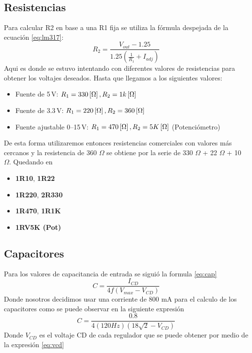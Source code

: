 \documentclass[pdflatex,sn-mathphys-num]{sn-jnl}%
\begin{document}
\subsection*{Resistencias}
Para calcular R2 en base a una R1 fija se utiliza la fórmula despejada de la ecuación \ref{eq:lm317}:
\begin{equation}
    R_2 = \dfrac{V_{out}-1.25}{1.25(\frac{1}{R_1}+I_{adj})}
\end{equation}
Aqui es donde se estuvo intentando con diferentes valores de resistencias para obtener los voltajes deseados. 
Hasta que llegamos a los siguientes valores:
\begin{itemize}
    \item Fuente de 5\,V: $R_1 = 330\left[\Omega\right], R_2 = 1k\left[\Omega\right]$
    \item Fuente de 3.3\,V: $R_1 = 220\left[\Omega\right], R_2 = 360\left[\Omega\right]$
    \item Fuente ajustable 0--15\,V: $R_1 = 470\left[\Omega\right], R_2 = 5K\left[\Omega\right]$ (Potenciómetro)
\end{itemize}
De esta forma utilizaremos entonces resistencias comerciales con valores más cercanos y la resistencia de 360 $\Omega$ se obtiene por la serie de 330 $\Omega$ + 22 $\Omega$ + 10 $\Omega$. Quedando en 
\begin{itemize}
    \item \textbf{1R10}, \textbf{1R22} 
    \item \textbf{1R220}, \textbf{2R330} 
    \item \textbf{1R470}, \textbf{1R1K} 
    \item \textbf{1RV5K (Pot)}
\end{itemize}


\subsection*{Capacitores}
Para los valores de capacitancia de entrada se siguió la formula \ref{eq:cap}
\begin{equation}
    C=\dfrac{I_{CD}}{4f(V_{max}-V_{CD})}
    \label{eq:cap}
\end{equation}
Donde nosotros decidimos usar una corriente de 800 mA para el calculo de los capacitores como se puede observar en la siguiente expresión
$$
C=\dfrac{0.8}{4(120 Hz)(18 \sqrt{2} - V_{CD})}
$$
Donde $V_{CD}$ es el voltaje CD de cada regulador que se puede obtener por medio de la expresión \ref{eq:vcd}
\end{document}
